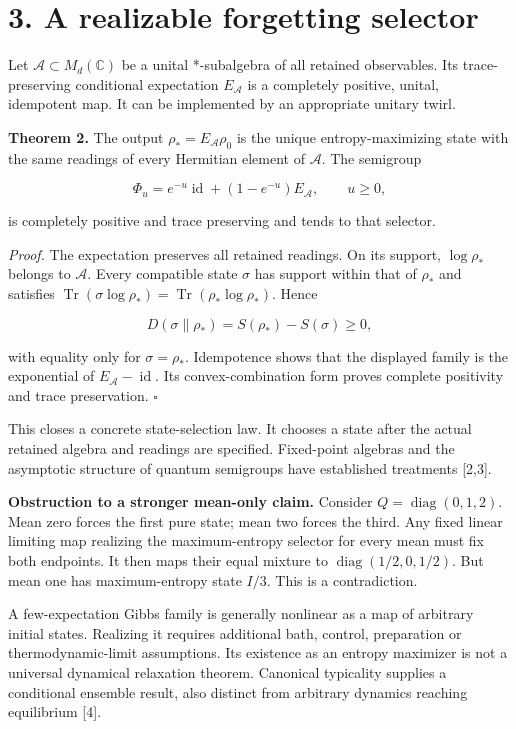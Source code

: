 \documentclass[
  11pt,
  a4paper,
]{article}
\begin{document}
\section{3. A realizable forgetting selector}\label{a-realizable-forgetting-selector}

Let \(\mathcal A\subset M_d(\mathbb C)\) be a unital *-subalgebra of all retained observables. Its trace-preserving conditional expectation \(E_{\mathcal A}\) is a completely positive, unital, idempotent map. It can be implemented by an appropriate unitary twirl.

\textbf{Theorem 2.} The output \(\rho_*=E_{\mathcal A}\rho_0\) is the unique entropy-maximizing state with the same readings of every Hermitian element of \(\mathcal A\). The semigroup

\[\Phi_u=e^{-u}\operatorname{id}+(1-e^{-u})E_{\mathcal A},\qquad u\ge0,\]

is completely positive and trace preserving and tends to that selector.

\emph{Proof.} The expectation preserves all retained readings. On its support, \(\log\rho_*\) belongs to \(\mathcal A\). Every compatible state \(\sigma\) has support within that of \(\rho_*\) and satisfies \(\operatorname{Tr}(\sigma\log\rho_*)=\operatorname{Tr}(\rho_*\log\rho_*)\). Hence

\[D(\sigma\|\rho_*)=S(\rho_*)-S(\sigma)\ge0,\]

with equality only for \(\sigma=\rho_*\). Idempotence shows that the displayed family is the exponential of \(E_{\mathcal A}-\operatorname{id}\). Its convex-combination form proves complete positivity and trace preservation. \(\square\)

This closes a concrete state-selection law. It chooses a state after the actual retained algebra and readings are specified. Fixed-point algebras and the asymptotic structure of quantum semigroups have established treatments {[}2,3{]}.

\textbf{Obstruction to a stronger mean-only claim.} Consider \(Q=\operatorname{diag}(0,1,2)\). Mean zero forces the first pure state; mean two forces the third. Any fixed linear limiting map realizing the maximum-entropy selector for every mean must fix both endpoints. It then maps their equal mixture to \(\operatorname{diag}(1/2,0,1/2)\). But mean one has maximum-entropy state \(I/3\). This is a contradiction.

A few-expectation Gibbs family is generally nonlinear as a map of arbitrary initial states. Realizing it requires additional bath, control, preparation or thermodynamic-limit assumptions. Its existence as an entropy maximizer is not a universal dynamical relaxation theorem. Canonical typicality supplies a conditional ensemble result, also distinct from arbitrary dynamics reaching equilibrium {[}4{]}.
\end{document}
